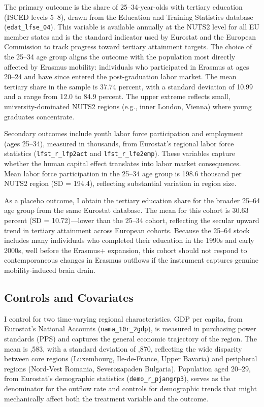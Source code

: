 \documentclass[12pt]{article}
\begin{document}
The primary outcome is the share of 25--34-year-olds with tertiary education (ISCED levels 5--8), drawn from the Education and Training Statistics database (\texttt{edat\_lfse\_04}). This variable is available annually at the NUTS2 level for all EU member states and is the standard indicator used by Eurostat and the European Commission to track progress toward tertiary attainment targets. The choice of the 25--34 age group aligns the outcome with the population most directly affected by Erasmus mobility: individuals who participated in Erasmus at ages 20--24 and have since entered the post-graduation labor market. The mean tertiary share in the sample is 37.74 percent, with a standard deviation of 10.99 and a range from 12.0 to 84.9 percent. The upper extreme reflects small, university-dominated NUTS2 regions (e.g., inner London, Vienna) where young graduates concentrate.

Secondary outcomes include youth labor force participation and employment (ages 25--34), measured in thousands, from Eurostat's regional labor force statistics (\texttt{lfst\_r\_lfp2act} and \texttt{lfst\_r\_lfe2emp}). These variables capture whether the human capital effect translates into labor market consequences. Mean labor force participation in the 25--34 age group is 198.6 thousand per NUTS2 region (SD = 194.4), reflecting substantial variation in region size.

As a placebo outcome, I obtain the tertiary education share for the broader 25--64 age group from the same Eurostat database. The mean for this cohort is 30.63 percent (SD = 10.72)---lower than the 25--34 cohort, reflecting the secular upward trend in tertiary attainment across European cohorts. Because the 25--64 stock includes many individuals who completed their education in the 1990s and early 2000s, well before the Erasmus+ expansion, this cohort should not respond to contemporaneous changes in Erasmus outflows if the instrument captures genuine mobility-induced brain drain.

\subsection{Controls and Covariates}

I control for two time-varying regional characteristics. GDP per capita, from Eurostat's National Accounts (\texttt{nama\_10r\_2gdp}), is measured in purchasing power standards (PPS) and captures the general economic trajectory of the region. The mean is ,583, with a standard deviation of ,870, reflecting the wide disparity between core regions (Luxembourg, Ile-de-France, Upper Bavaria) and peripheral regions (Nord-Vest Romania, Severozapaden Bulgaria). Population aged 20--29, from Eurostat's demographic statistics (\texttt{demo\_r\_pjangrp3}), serves as the denominator for the outflow rate and controls for demographic trends that might mechanically affect both the treatment variable and the outcome.
\end{document}
